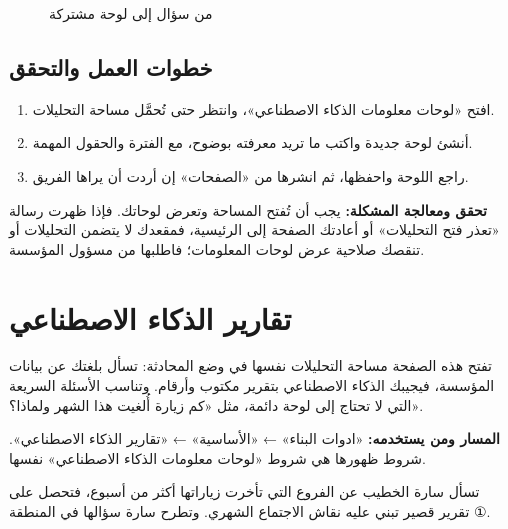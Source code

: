 \begin{figure}[H]
\centering
{}
\rclegend
\caption{من سؤال إلى لوحة مشتركة}
\label{fig:builder-ai-dashboards-flow}
\end{figure}

\subsection{خطوات العمل والتحقق}
\begin{enumerate}
\item افتح «لوحات معلومات الذكاء الاصطناعي»، وانتظر حتى تُحمَّل مساحة التحليلات.
\item أنشئ لوحة جديدة واكتب ما تريد معرفته بوضوح، مع الفترة والحقول المهمة.
\item راجع اللوحة واحفظها، ثم انشرها من «الصفحات» إن أردت أن يراها الفريق.
\end{enumerate}

\textbf{تحقق ومعالجة المشكلة:} يجب أن تُفتح المساحة وتعرض لوحاتك. فإذا ظهرت رسالة «تعذر فتح التحليلات» أو أعادتك الصفحة إلى الرئيسية، فمقعدك لا يتضمن التحليلات أو تنقصك صلاحية عرض لوحات المعلومات؛ فاطلبها من مسؤول المؤسسة.

\clearpage
\section{تقارير الذكاء الاصطناعي}
\label{sec:builder-feature-ai-reports}

تفتح هذه الصفحة مساحة التحليلات نفسها في وضع المحادثة: تسأل بلغتك عن بيانات المؤسسة، فيجيبك الذكاء الاصطناعي بتقرير مكتوب وأرقام. وتناسب الأسئلة السريعة التي لا تحتاج إلى لوحة دائمة، مثل «كم زيارة أُلغيت هذا الشهر ولماذا؟».

\textbf{المسار ومن يستخدمه:} «ادوات البناء» ← «الأساسية» ← «تقارير الذكاء الاصطناعي». شروط ظهورها هي شروط «لوحات معلومات الذكاء الاصطناعي» نفسها.

\begin{rcnote}
تسأل سارة الخطيب عن الفروع التي تأخرت زياراتها أكثر من أسبوع، فتحصل على تقرير قصير تبني عليه نقاش الاجتماع الشهري. وتطرح سارة سؤالها في المنطقة ①.
\end{rcnote}

